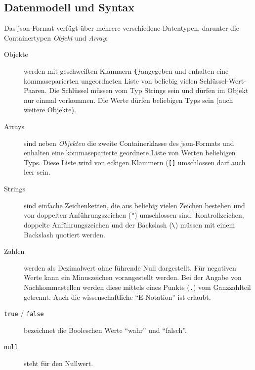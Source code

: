 \subsection{Datenmodell und Syntax}
\label{sec:jsontypes}

Das \acrshort{json}-Format verfügt über mehrere verschiedene Datentypen, darunter die Containertypen \emph{Objekt} und \emph{Array}:\cite{ecma404}

\begin{description}
    \item[Objekte] werden mit geschweiften Klammern \texttt{\{\}}angegeben und enhalten eine kommaseparierten ungeordneten Liste von beliebig vielen Schlüssel-Wert-Paaren. Die Schlüssel müssen vom Typ Strings sein und dürfen im Objekt nur einmal vorkommen. Die Werte dürfen beliebigen Typs sein (auch weitere Objekte).
    \item[Arrays] sind neben \emph{Objekten} die zweite Containerklasse des \acrshort{json}-Formats und enhalten eine kommaseparierte geordnete Liste von Werten beliebigen Typs. Diese Liste wird von eckigen Klammern (\texttt{[]} umschlossen darf auch leer sein.
    \item[Strings] sind einfache Zeichenketten, die aus beliebig vielen Zeichen bestehen und von doppelten Anführungszeichen (\texttt{"}) umschlossen sind. Kontrollzeichen, doppelte Anführungszeichen und der Backslash (\texttt{\textbackslash})  müssen mit einem Backslash quotiert werden.
    \item[Zahlen] werden als Dezimalwert ohne führende Null dargestellt. Für negativen Werte kann ein Minuszeichen vorangestellt werden. Bei der Angabe von Nachkommastellen werden diese mittels eines Punkts (\texttt{.}) vom Ganzzahlteil getrennt. Auch die wissenschaftliche \enquote{E-Notation} ist erlaubt.
    \item[\texttt{true} / \texttt{false}] bezeichnet die Booleschen Werte \enquote{wahr} und \enquote{falsch}.
    \item[\texttt{null}] steht für den Nullwert.
\end{description}

